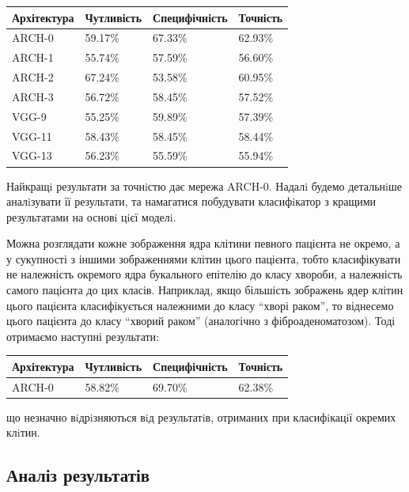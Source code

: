 \bigskip
\begin{center}
\begin{tabular}
{| m{3cm} || m{3cm} | m{3cm} | m{3cm} |}
\hline
Архітектура & Чутливість & Специфічність & Точність \\ \hline \hline
ARCH-0 & 59.17\%  & 67.33\%  & 62.93\%  \\ \hline
ARCH-1 & 55.74\%  & 57.59\%  & 56.60\%  \\ \hline
ARCH-2 & 67.24\%  & 53.58\%  & 60.95\%  \\ \hline
ARCH-3 & 56.72\%  & 58.45\%  & 57.52\%  \\ \hline
VGG-9  & 55.25\%  & 59.89\%  & 57.39\%  \\ \hline
VGG-11 & 58.43\%  & 58.45\%  & 58.44\%  \\ \hline
VGG-13 & 56.23\%  & 55.59\%  & 55.94\%  \\ \hline
\end{tabular}
\end{center}
\bigskip

Найкращi результати за точнiстю дає мережа ARCH-0. Надалi будемо детальнiше аналiзувати її результати, та намагатися побудувати класифiкатор з кращими результатами на основi цiєї моделi.

Можна розглядати кожне зображення ядра клітини певного пацієнта не окремо, а у сукупності з іншими зображеннями клітин цього пацієнта, тобто класифікувати не належність окремого ядра букального епітелію до класу хвороби, а належність самого пацієнта до цих класів. Наприклад, якщо більшість зображень ядер клітин цього пацієнта класифікується належними до класу \enquote{хворі раком}, то віднесемо цього пацієнта до класу \enquote{хворий раком} (аналогічно з фіброаденоматозом). Тоді отримаємо наступні результати:


\begin{center}
	\begin{tabular}
		{| m{3cm} || m{3cm} | m{3cm} | m{3cm} |}
		\hline
		Архітектура & Чутливість & Специфічність & Точність \\ \hline \hline
		ARCH-0 & 58.82\%  & 69.70\%  & 62.38\%  \\ \hline
	\end{tabular}
\end{center}

що незначно вiдрiзняються вiд результатiв, отриманих при класифiкацiї окремих клiтин.

\subsection{Аналіз результатів}

